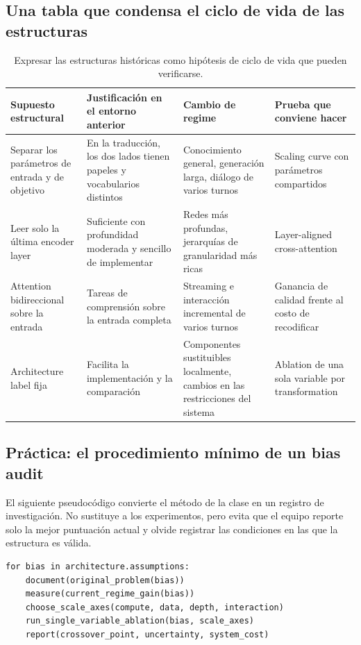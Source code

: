 \subsection{Una tabla que condensa el ciclo de vida de las estructuras}

\begin{table}[H]
\centering
\small
\begin{tabular}{@{}L{0.17\textwidth}L{0.24\textwidth}L{0.24\textwidth}L{0.25\textwidth}@{}}
\toprule
Supuesto estructural & Justificación en el entorno anterior & Cambio de regime & Prueba que conviene hacer \\
\midrule
Separar los parámetros de entrada y de objetivo & En la traducción, los dos lados tienen papeles y vocabularios distintos & Conocimiento general, generación larga, diálogo de varios turnos & Scaling curve con parámetros compartidos \\
Leer solo la última encoder layer & Suficiente con profundidad moderada y sencillo de implementar & Redes más profundas, jerarquías de granularidad más ricas & Layer-aligned cross-attention \\
Attention bidireccional sobre la entrada & Tareas de comprensión sobre la entrada completa & Streaming e interacción incremental de varios turnos & Ganancia de calidad frente al costo de recodificar \\
Architecture label fija & Facilita la implementación y la comparación & Componentes sustituibles localmente, cambios en las restricciones del sistema & Ablation de una sola variable por transformation \\
\bottomrule
\end{tabular}
\caption{Expresar las estructuras históricas como hipótesis de ciclo de vida que pueden verificarse.}
\end{table}

\subsection{Práctica: el procedimiento mínimo de un bias audit}

El siguiente pseudocódigo convierte el método de la clase en un registro de investigación. No sustituye a los experimentos, pero evita que el equipo reporte solo la mejor puntuación actual y olvide registrar las condiciones en las que la estructura es válida.

\begin{lstlisting}[caption={Plantilla de registro de investigación para un inductive-bias audit}]
for bias in architecture.assumptions:
    document(original_problem(bias))
    measure(current_regime_gain(bias))
    choose_scale_axes(compute, data, depth, interaction)
    run_single_variable_ablation(bias, scale_axes)
    report(crossover_point, uncertainty, system_cost)
\end{lstlisting}


